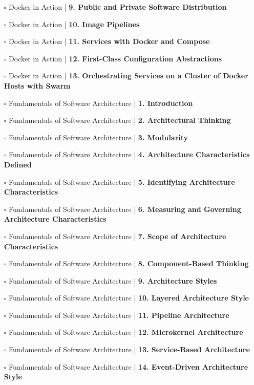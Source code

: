 \documentclass[a4, landscape, 12pt]{article}
\newcommand{\checkbox}{$\square$}%
\begin{document}
\begin{itemize}
{}
\item [\checkbox]  Docker in Action | \textbf{ 9. Public and Private Software Distribution
}
\item [\checkbox]  Docker in Action | \textbf{ 10. Image Pipelines
}
\item [\checkbox]  Docker in Action | \textbf{ 11. Services with Docker and Compose
}
\item [\checkbox]  Docker in Action | \textbf{ 12. First-Class Configuration Abstractions
}
\item [\checkbox]  Docker in Action | \textbf{ 13. Orchestrating Services on a Cluster of Docker Hosts with Swarm
}
\item [\checkbox]  Fundamentals of Software Architecture  | \textbf{ 1. Introduction
}
\item [\checkbox]  Fundamentals of Software Architecture  | \textbf{ 2. Architectural Thinking
}
\item [\checkbox]  Fundamentals of Software Architecture  | \textbf{ 3. Modularity
}
\item [\checkbox]  Fundamentals of Software Architecture  | \textbf{ 4. Architecture Characteristics Defined
}
\item [\checkbox]  Fundamentals of Software Architecture  | \textbf{ 5. Identifying Architecture Characteristics
}
\item [\checkbox]  Fundamentals of Software Architecture  | \textbf{ 6. Measuring and Governing Architecture Characteristics
}
\item [\checkbox]  Fundamentals of Software Architecture  | \textbf{ 7. Scope of Architecture Characteristics
}
\item [\checkbox]  Fundamentals of Software Architecture  | \textbf{ 8. Component-Based Thinking
}
\item [\checkbox]  Fundamentals of Software Architecture  | \textbf{ 9. Architecture Styles
}
\item [\checkbox]  Fundamentals of Software Architecture  | \textbf{ 10. Layered Architecture Style
}
\item [\checkbox]  Fundamentals of Software Architecture  | \textbf{ 11. Pipeline Architecture
}
\item [\checkbox]  Fundamentals of Software Architecture  | \textbf{ 12. Microkernel Architecture
}
\item [\checkbox]  Fundamentals of Software Architecture  | \textbf{ 13. Service-Based Architecture
}
\item [\checkbox]  Fundamentals of Software Architecture  | \textbf{ 14. Event-Driven Architecture Style
}
\end{itemize}
\end{document}
